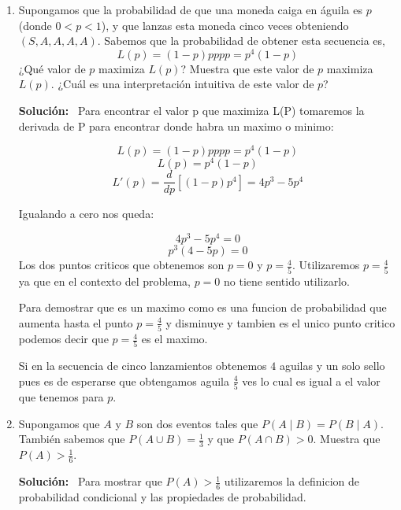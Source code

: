 \documentclass[11pt,letterpaper]{article}
\newenvironment{solution}{%
  \noindent\begin{shaded}
  \textbf{Solución:}\ }{
  \end{shaded}%
}
\begin{document}
\begin{enumerate}
\begin{solution}
En el cual hay una probabilidad de \(\frac{1}{6}\) en obtener un 1. Una probabilidad de \(\frac{1}{6}\) de obtener un \(3\) y sumar \(a\) puntos. Una probabilidad de \(\frac{3}{6}\) de obtener un \(2,4,5\) el cual no suma puntos. Por ultimo \(\frac{1}{6}\) de botener un \(6\) que restaria \(b\) puntos.

Simplificando la ecuacion \(V\) nos queda como:

\[V=a-b\]

Siendo \(V\) el valor total de la cantidad esperada de puntos. Esto indica que el promedio mayoria de las veces seria ganar \(a\) puntos y perder \(b\) puntos ya que cualquier otro numero fuera de \(3\) o \(6\) no afectara el total de nuestro valor.
  \end{solution}
\item%
  Supongamos que la probabilidad de que una moneda caiga en águila es
  \(p\) (donde \(0 < p < 1\)), y que lanzas esta moneda cinco veces
  obteniendo \(\left(S, A, A, A, A\right)\).  Sabemos que la
  probabilidad de obtener esta secuencia es,
  \[ L(p) = (1-p)pppp = p^4(1-p) \]
  ¿Qué valor de \(p\) maximiza \(L(p)\)? Muestra que este valor de
  \(p\) maximiza \(L(p)\). ¿Cuál es una interpretación intuitiva de
  este valor de \(p\)?
  \begin{solution}
    Para encontrar el valor p que maximiza L(P) tomaremos la derivada de P para encontrar donde habra un maximo o minimo:

 \[ L(p) = (1-p)pppp = p^4(1-p) \]
 \[ L(p) = p^4(1-p) \]
 \[ L'(p) = \frac{d}{dp}[(1-p)p^4] = 4p^3 - 5p^4\]

Igualando a cero nos queda:

\[4p^3 - 5p^4 = 0\]
\[p^3(4-5p)=0\]
Los dos puntos criticos que obtenemos son \(p = 0\) y  \(p = \frac{4}{5}\). Utilizaremos \(p = \frac{4}{5}\) ya que en el contexto del problema, \(p = 0\) no tiene sentido utilizarlo.

Para demostrar que es un maximo como es una funcion de probabilidad que aumenta hasta el punto \(p = \frac{4}{5}\) y disminuye y tambien es el unico punto critico podemos decir que \(p = \frac{4}{5}\) es el maximo.

Si en la secuencia de cinco lanzamientos obtenemos \(4\) aguilas y un solo sello pues es de esperarse que obtengamos aguila \(\frac{4}{5}\) ves lo cual es igual a el valor que tenemos para \(p\).
  \end{solution}
\item%
  Supongamos que \(A\) y \(B\) son dos eventos tales que \(P(A \mid B)
  = P(B \mid A)\).  También sabemos que \(P(A \cup B) = \frac{1}{3}\)
  y que \(P(A \cap B) > 0\).  Muestra que \(P(A) > \frac{1}{6}\).
  \begin{solution}
    Para mostrar que \(P(A) > \frac{1}{6}\) utilizaremos la definicion de probabilidad condicional y las propiedades de probabilidad.


\end{solution}
\end{enumerate}
\end{document}
